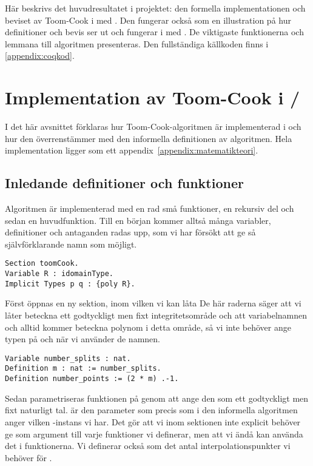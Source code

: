 Här beskrivs det huvudresultatet i projektet: den formella implementationen och
beviset av Toom-Cook i \coq med \ssr. Den fungerar också som en illustration på
hur definitioner och bevis ser ut och fungerar i \coq med \ssr. De viktigaste
funktionerna och lemmana till algoritmen presenteras. Den fullständiga
källkoden finns i \ref{appendix:coqkod}.

\section{Implementation av Toom-Cook i \coq/\ssr}
\label{sec:formellimplementation}
I det här avsnittet förklaras hur Toom-Cook-algoritmen är implementerad i
\ssr{} och hur den överrenstämmer med den informella definitionen av
algoritmen. Hela implementation ligger som ett
appendix~\ref{appendix:matematikteori}.

\subsection{Inledande definitioner och funktioner}
\label{section:forminl}
Algoritmen är implementerad med en rad små funktioner, en rekursiv del och
sedan en huvudfunktion. Till en början kommer alltså många variabler,
definitioner och antaganden radas upp, som vi har försökt att ge så
självförklarande namn som möjligt.

\begin{lstlisting}
Section toomCook.
Variable R : idomainType.
Implicit Types p q : {poly R}.
\end{lstlisting}

Först öppnas en ny sektion, inom vilken vi kan låta De här raderna säger att vi
låter  beteckna ett godtyckligt men fixt integritetsområde och att
variabelnamnen  och  alltid kommer beteckna polynom i detta område,
så vi inte behöver ange typen på  och  när vi använder de namnen.

\begin{lstlisting}
Variable number_splits : nat.
Definition m : nat := number_splits.
Definition number_points := (2 * m) .-1.
\end{lstlisting}

Sedan parametriseras funktionen på  genom att ange den som ett godtyckligt
men fixt naturligt tal.  är den parameter som precis som i den informella
algoritmen anger vilken \toomm{}-instans vi har. Det gör att vi inom sektionen
inte explicit behöver ge  som argument till varje funktioner vi definerar,
men att vi ändå kan använda det i funktionerna. Vi definerar också
 som det antal interpolationspunkter vi behöver för \toomm{}.

